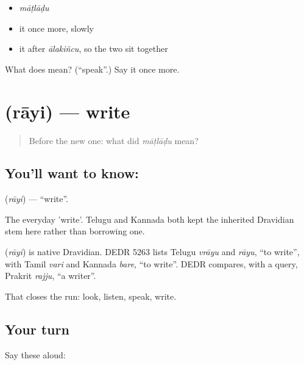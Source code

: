 \begin{itemize}
\raggedright
  \item \emph{māṭlāḍu}
  \item it once more, slowly
  \item it after \emph{ālakiñcu}, so the two sit together
\end{itemize}

\begin{tcolorbox}[breakable,colback=teal!4,colframe=teal!35!black,title={Before you move on}]
What does  mean? (\textquotedblleft{}speak\textquotedblright{}.) Say it once more.
\end{tcolorbox}
\section[\texorpdfstring{\te{రాయి} (rāyi)}{రాయి (rāyi)}]{ (rāyi) — write}

\label{lesson:TE-C44-write}



\begin{quote}
Before the new one: what did \emph{māṭlāḍu} mean?
\end{quote}

\subsection*{You'll want to know: }
\textbf{} (\emph{rāyi}) — \textquotedblleft{}write\textquotedblright{}.

The everyday 'write'. Telugu and Kannada both kept the inherited Dravidian stem here rather than borrowing one.

\begin{cousinweb}
\textbf{} (\emph{rāyi}) is native Dravidian. DEDR 5263 lists Telugu \emph{vrāyu} and \emph{rāyu}, \textquotedblleft{}to write\textquotedblright{}, with Tamil \emph{vari} and Kannada \emph{bare}, \textquotedblleft{}to write\textquotedblright{}. DEDR compares, with a query, Prakrit \emph{rajju}, \textquotedblleft{}a writer\textquotedblright{}.
\end{cousinweb}

\begin{grammarlens}[title={What you've built}]
That closes the run: look, listen, speak, write.
\end{grammarlens}

\subsection*{Your turn}
Say these aloud:

